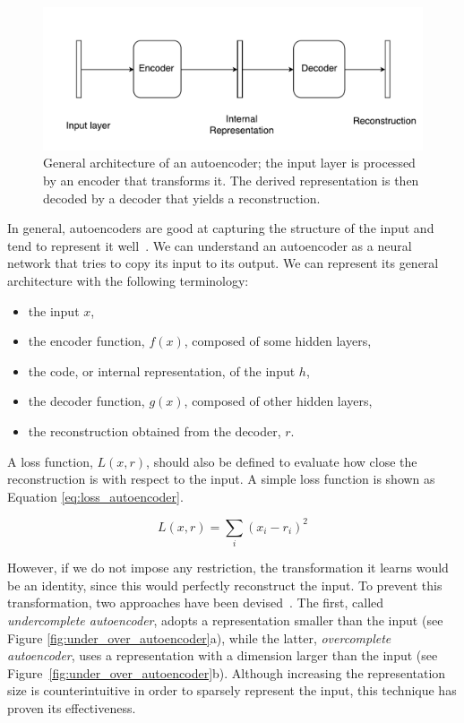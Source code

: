\begin{figure}[h]
\centering
\includegraphics[width=.9\columnwidth]{images/05-modeling/autoencoder_architecture}
\caption{General architecture of an autoencoder; the input layer is processed by an encoder that transforms it. The derived representation is then decoded by a decoder that yields a reconstruction.}
\label{fig:autoencoder_architecture}
\end{figure}

In general, autoencoders are good at capturing the structure of the input and tend to represent it well~\citep{goodfellow_deep_2016}. We can understand an autoencoder as a neural network that tries to copy its input to its output. We can represent its general architecture with the following terminology:

\begin{itemize}[leftmargin=*,labelsep=5.8mm]
	\item the input $x$,
  \item the {encoder function}, $f(x)$, composed of some hidden layers,
  \item the {code}, or internal representation, of the input $h$,
  \item the {decoder function}, $g(x)$, composed of other hidden layers,
  \item the reconstruction obtained from the decoder, $r$.
\end{itemize}

A {loss function}, $L(x, r)$, should also be defined to evaluate how close the reconstruction is with respect to the input.
A simple loss function is shown as Equation \eqref{eq:loss_autoencoder}.

\begin{equation} \label{eq:loss_autoencoder}
L(x,r) = \sum_{i} (x_i - r_i)^2
\end{equation}

However, if we do not impose any restriction, the transformation it learns would be an identity, since this would perfectly reconstruct the input. To prevent this transformation, two approaches have been devised~\citep{goodfellow_deep_2016}. The first, called \textit{undercomplete autoencoder}, adopts a representation smaller than the input (see Figure \ref{fig:under_over_autoencoder}a), while the latter, \textit{overcomplete autoencoder}, uses a representation with a dimension larger than the input (see Figure~\ref{fig:under_over_autoencoder}b). Although increasing the representation size is counterintuitive in order to sparsely represent the input, this technique has proven its effectiveness.

